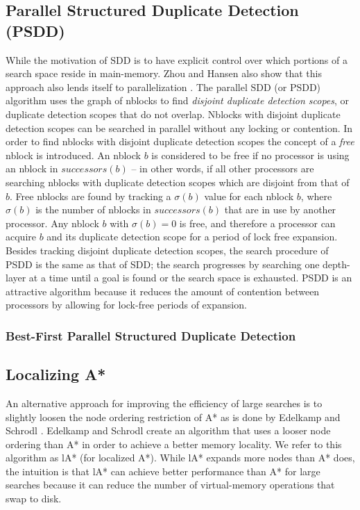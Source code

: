 \documentclass{article}
\begin{document}
\subsection{Parallel Structured Duplicate Detection (PSDD)}

While the motivation of SDD is to have explicit control over which
portions of a search space reside in main-memory.  Zhou and Hansen
also show that this approach also lends itself to parallelization
\cite{zhou:psd}.  The parallel SDD (or PSDD) algorithm uses the graph
of nblocks to find \emph{disjoint duplicate detection scopes}, or
duplicate detection scopes that do not overlap.  Nblocks with disjoint
duplicate detection scopes can be searched in parallel without any
locking or contention.  In order to find nblocks with disjoint
duplicate detection scopes the concept of a \emph{free} nblock is
introduced.  An nblock $b$ is considered to be free if no processor is
using an nblock in $successors(b)$ -- in other words, if all other
processors are searching nblocks with duplicate detection scopes which
are disjoint from that of $b$.  Free nblocks are found by tracking a
$\sigma(b)$ value for each nblock $b$, where $\sigma(b)$ is the number
of nblocks in $successors(b)$ that are in use by another processor.
Any nblock $b$ with $\sigma(b) = 0$ is free, and therefore a processor
can acquire $b$ and its duplicate detection scope for a period of lock
free expansion.  Besides tracking disjoint duplicate detection scopes,
the search procedure of PSDD is the same as that of SDD; the search
progresses by searching one depth-layer at a time until a goal is
found or the search space is exhausted.  PSDD is an attractive
algorithm because it reduces the amount of contention between
processors by allowing for lock-free periods of expansion.

\subsubsection{Best-First Parallel Structured Duplicate Detection}



\subsection{Localizing A*}

An alternative approach for improving the efficiency of large searches
is to slightly loosen the node ordering restriction of A* as is done
by Edelkamp and Schrodl \cite{edelkamp:loc}.  Edelkamp and Schrodl
create an algorithm that uses a looser node ordering than A* in order
to achieve a better memory locality. We refer to this algorithm as lA*
(for localized A*).  While lA* expands more nodes than A* does, the
intuition is that lA* can achieve better performance than A* for large
searches because it can reduce the number of virtual-memory operations
that swap to disk.
\end{document}
